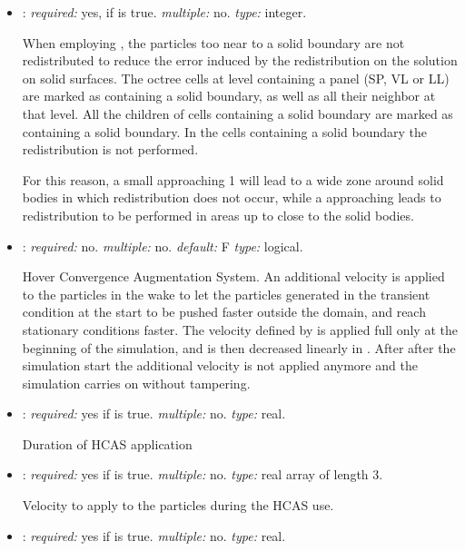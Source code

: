 \begin{itemize}
\item {}: \textit{required:} yes, if 
 is true. \textit{multiple:} no. 
\textit{type:} integer.

When employing , the particles too near 
to a solid boundary are not redistributed to reduce the error induced by 
the redistribution on the solution on solid surfaces. The octree cells at 
level  containing a panel (SP, VL or LL) are marked 
as containing a solid boundary, as well as all their neighbor at that level. 
All the children of cells containing a solid boundary are marked as containing 
a solid boundary. In the cells containing a solid boundary the redistribution 
is not performed.

For this reason, a small  approaching 1 will lead 
to a wide zone around solid bodies in which redistribution does not occur, 
while a  approaching  leads 
to redistribution to be performed in areas up to close to the solid bodies.

\item {}: \textit{required:} no. \textit{multiple:} no. 
\textit{default:} F \textit{type:} logical.

Hover Convergence Augmentation System. An additional velocity is applied 
to the particles in the wake to let the particles generated in the transient 
condition at the start to be pushed faster outside the domain, and reach 
stationary conditions faster. The velocity defined by  
is applied full only at the beginning of the simulation, and is then decreased 
linearly in . After  after the simulation 
start the additional velocity is not applied anymore and the simulation carries 
on without tampering. 

\item {}: \textit{required:} yes if  is true. 
\textit{multiple:} no. \textit{type:} real.

Duration of HCAS application

\item {}: \textit{required:} yes if  is true. 
\textit{multiple:} no. \textit{type:} real array of length 3.

Velocity to apply to the particles during the HCAS use. 

\item {}: \textit{required:} yes if  is true. 
\textit{multiple:} no. \textit{type:} real.


\end{itemize}
